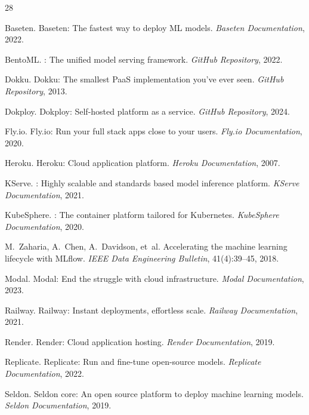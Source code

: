 
\begin{thebibliography}{28}

Baseten.
\newblock Baseten: The fastest way to deploy {ML} models.
\newblock \emph{Baseten Documentation}, 2022.

BentoML.
: The unified model serving framework.
\newblock \emph{GitHub Repository}, 2022.

Dokku.
\newblock Dokku: The smallest {PaaS} implementation you've ever seen.
\newblock \emph{GitHub Repository}, 2013.

Dokploy.
\newblock Dokploy: Self-hosted platform as a service.
\newblock \emph{GitHub Repository}, 2024.

Fly.io.
\newblock Fly.io: Run your full stack apps close to your users.
\newblock \emph{Fly.io Documentation}, 2020.

Heroku.
\newblock Heroku: Cloud application platform.
\newblock \emph{Heroku Documentation}, 2007.

KServe.
: Highly scalable and standards based model inference platform.
\newblock \emph{KServe Documentation}, 2021.

KubeSphere.
: The container platform tailored for {Kubernetes}.
\newblock \emph{KubeSphere Documentation}, 2020.

M.~Zaharia, A.~Chen, A.~Davidson, et~al.
\newblock Accelerating the machine learning lifecycle with {MLflow}.
\newblock \emph{IEEE Data Engineering Bulletin}, 41(4):39--45, 2018.

Modal.
\newblock Modal: End the struggle with cloud infrastructure.
\newblock \emph{Modal Documentation}, 2023.

Railway.
\newblock Railway: Instant deployments, effortless scale.
\newblock \emph{Railway Documentation}, 2021.

Render.
\newblock Render: Cloud application hosting.
\newblock \emph{Render Documentation}, 2019.

Replicate.
\newblock Replicate: Run and fine-tune open-source models.
\newblock \emph{Replicate Documentation}, 2022.

Seldon.
\newblock Seldon core: An open source platform to deploy machine learning models.
\newblock \emph{Seldon Documentation}, 2019.


\end{thebibliography}
